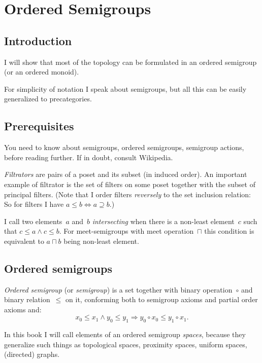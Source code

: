 \chapter{Ordered Semigroups}

\section{Introduction}

I will show that most of the topology can be formulated in an ordered semigroup (or an ordered monoid).

For simplicity of notation I speak about semigroups, but all this can be easily generalized to precategories.

\section{Prerequisites}

You need to know about semigroups, ordered semigroups, semigroup actions, before reading further. If in doubt, consult Wikipedia.

\emph{Filtrators} are pairs of a poset and its subset (in induced order). An important example of filtrator is the set of filters on some poset together with the subset of principal filters. (Note that I order filters \emph{reversely} to the set inclusion relation: So for filters I have $a\leq b \Leftrightarrow a\supseteq b$.)

I call two elements~$a$ and~$b$ \emph{intersecting} when there is a non-least element~$c$ such that $c\leq a\land c\leq b$. For meet-semigroups with meet operation~$\sqcap$ this condition is equivalent to $a\sqcap b$ being non-least element.

\section{Ordered semigroups}

\begin{defn}
\emph{Ordered semigroup} (or \emph{semigroup}) is a set together with binary operation~$\circ$ and binary relation~$\leq$ on it, conforming both to semigroup axioms and partial order axioms and:
\[ x_0\leq x_1\land y_0\leq y_1\Rightarrow y_0\circ x_0\leq y_1\circ x_1. \]
\end{defn}

In this book I will call elements of an ordered semigroup \emph{spaces}, because they generalize such things as topological spaces, proximity spaces, uniform spaces, (directed) graphs.

